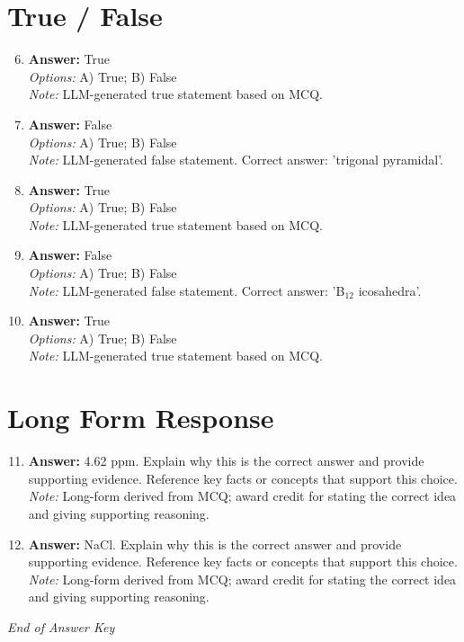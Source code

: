 \documentclass[12pt]{article}
\begin{document}
\section*{True / False}
\begin{enumerate}[label=\arabic*.]
\setcounter{enumi}{5}
\item \textbf{Answer:} True
\\ \textit{Options:} A) True; B) False
\\ \textit{Note:} LLM-generated true statement based on MCQ.
\item \textbf{Answer:} False
\\ \textit{Options:} A) True; B) False
\\ \textit{Note:} LLM-generated false statement. Correct answer: 'trigonal pyramidal'.
\item \textbf{Answer:} True
\\ \textit{Options:} A) True; B) False
\\ \textit{Note:} LLM-generated true statement based on MCQ.
\item \textbf{Answer:} False
\\ \textit{Options:} A) True; B) False
\\ \textit{Note:} LLM-generated false statement. Correct answer: 'B$_{12}$ icosahedra'.
\item \textbf{Answer:} True
\\ \textit{Options:} A) True; B) False
\\ \textit{Note:} LLM-generated true statement based on MCQ.
\end{enumerate}

\section*{Long Form Response}
\begin{enumerate}[label=\arabic*.]
\setcounter{enumi}{10}
\item \textbf{Answer:} 4.62 ppm. Explain why this is the correct answer and provide supporting evidence. Reference key facts or concepts that support this choice.
\\ \textit{Note:} Long-form derived from MCQ; award credit for stating the correct idea and giving supporting reasoning.
\item \textbf{Answer:} NaCl. Explain why this is the correct answer and provide supporting evidence. Reference key facts or concepts that support this choice.
\\ \textit{Note:} Long-form derived from MCQ; award credit for stating the correct idea and giving supporting reasoning.
\end{enumerate}

\vfill
\noindent\textit{End of Answer Key}
\end{document}
